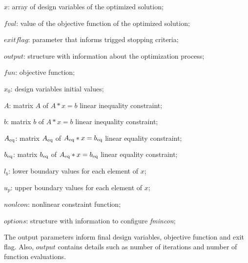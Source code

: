 \begin{description}
	\item \hspace{20pt}$x$: array of design variables of the optimized solution;
	\item \hspace{20pt}$fval$: value of the objective function of the optimized solution;
	\item \hspace{20pt}$exitflag$: parameter that informs trigged stopping criteria;
	\item \hspace{20pt}$output$: structure with information about the optimization process;
	\item \hspace{20pt}$fun$: objective function;
	\item \hspace{20pt}$x_0$: design variables initial values;
	\item \hspace{20pt}$A$: matrix $A$ of $A*x=b$ linear inequality constraint;
	\item \hspace{20pt}$b$: matrix $b$ of $A*x=b$ linear inequality constraint;
	\item \hspace{20pt}$A\textsubscript{eq}$: matrix $A\textsubscript{eq}$ of $A\textsubscript{eq}*x=b\textsubscript{eq}$ linear equality constraint;
	\item \hspace{20pt}$b\textsubscript{eq}$: matrix $b\textsubscript{eq}$ of $A\textsubscript{eq}*x=b\textsubscript{eq}$ linear equality constraint;
	\item \hspace{20pt}$l_b$: lower boundary values for each element of $x$;
	\item \hspace{20pt}$u_p$: upper boundary values for each element of $x$;
	\item \hspace{20pt}$nonlcon$: nonlinear constraint function;
	\item \hspace{20pt}$options$: structure with information to configure \textit{fmincon};
\end{description}

The output parameters inform final design variables, objective function and exit flag. Also, $output$ contains details such as number of iterations and number of function evaluations. 

